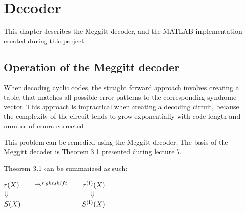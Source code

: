 \documentclass[Main]{subfiles}
\begin{document}


\chapter{Decoder}

This chapter describes the Meggitt decoder, and the MATLAB implementation created during this project.

\section{Operation of the Meggitt decoder} \label{sec:MeggitOperation}

When decoding cyclic codes, the straight forward approach involves creating a table, that matches all possible error patterns to the corresponding syndrome vector. This approach is impractical when creating a decoding circuit, because the complexity of the circuit tends to grow exponentially with code length and number of errors corrected \cite{lec7}.

This problem can be remedied using the Meggitt decoder. The basis of the Meggitt decoder is Theorem 3.1 presented during lecture 7\cite{lec7}.

\noindent
{}

Theorem 3.1 can be summarized as such:

$ r(X) \hspace*{2em}  \Rightarrow^{rightshift} \hspace*{2em} r^{(1)}(X)$ \\
$ \Downarrow \hspace*{12em} \Downarrow$ \\
$ S(X) \hspace*{9em} S^{(1)}(X)$ \\
\end{document}
